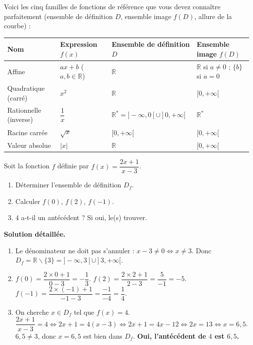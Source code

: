 \documentclass[11pt]{article}
\def\setminus{\mathbin{\backslash}}\let\smallsetminus\setminus
\begin{document}
\begin{exemplebox}
Voici les cinq familles de fonctions de référence que vous devez connaître parfaitement (ensemble de définition $D$, ensemble image $f(D)$, allure de la courbe) :

\begin{center}
\begin{tabularx}{\linewidth}{|l|X|X|X|}\hline
\textbf{Nom} & \textbf{Expression $f(x)$} & \textbf{Ensemble de définition $D$} & \textbf{Ensemble image $f(D)$} \\ \hline
Affine & $ax+b$ ($a,b \in \mathbb{R}$) & $\mathbb{R}$ & $\mathbb{R}$ si $a \neq 0$ ; $\{b\}$ si $a=0$ \\ \hline
Quadratique (carré) & $x^2$ & $\mathbb{R}$ & $[0, +\infty[$ \\ \hline
Rationnelle (inverse) & $\dfrac{1}{x}$ & $\mathbb{R}^* = ]-\infty,0[ \cup ]0,+\infty[$ & $\mathbb{R}^*$ \\ \hline
Racine carrée & $\sqrt{x}$ & $[0, +\infty[$ & $[0, +\infty[$ \\ \hline
Valeur absolue & $|x|$ & $\mathbb{R}$ & $[0, +\infty[$ \\ \hline
\end{tabularx}
\end{center}
\end{exemplebox}

\begin{exoresolu}
Soit la fonction $f$ définie par $f(x) = \dfrac{2x+1}{x-3}$.
\begin{enumerate}
\item Déterminer l'ensemble de définition $D_f$.
\item Calculer $f(0)$, $f(2)$, $f(-1)$.
\item $4$ a-t-il un antécédent ? Si oui, le(s) trouver.
\end{enumerate}
\tcblower
\textbf{Solution détaillée.}
\begin{enumerate}
\item Le dénominateur ne doit pas s'annuler : $x-3 \neq 0 \iff x \neq 3$.
Donc $D_f = \mathbb{R} \setminus \{3\} = ]-\infty, 3[ \cup ]3, +\infty[$.
\item $f(0) = \dfrac{2\times0+1}{0-3} = -\dfrac{1}{3}$.
$f(2) = \dfrac{2\times2+1}{2-3} = \dfrac{5}{-1} = -5$.
$f(-1) = \dfrac{2\times(-1)+1}{-1-3} = \dfrac{-1}{-4} = \dfrac{1}{4}$.
\item On cherche $x \in D_f$ tel que $f(x) = 4$.
$\dfrac{2x+1}{x-3} = 4 \iff 2x+1 = 4(x-3) \iff 2x+1 = 4x-12 \iff 2x = 13 \iff x = 6,5$.
$6,5 \neq 3$, donc $x=6,5$ est bien dans $D_f$. \textbf{Oui, l'antécédent de $4$ est $6,5$.}
\end{enumerate}
\end{exoresolu}
\end{document}

